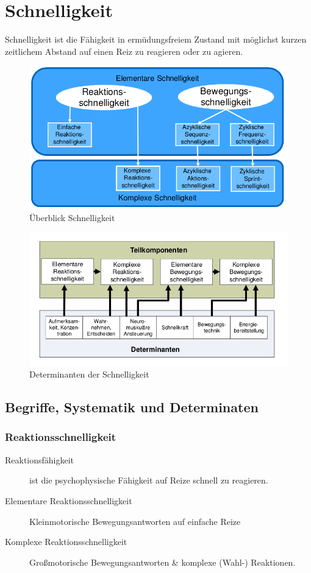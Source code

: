 
\section{Schnelligkeit}
Schnelligkeit ist die Fähigkeit in ermüdungsfreiem Zustand mit möglichst kurzen zeitlichem Abstand auf einen Reiz zu reagieren oder zu agieren.
\begin{figure}[H]
  \centering
  \includegraphics[width=.5\textwidth]{pictures/schnelligkeit_overview.png}
  \caption{Überblick Schnelligkeit}
\end{figure}
\begin{figure}[H]
  \centering
  \includegraphics[width=.5\linewidth]{pictures/schnelligkeit_determinanten.png}
  \caption{Determinanten der Schnelligkeit}
\end{figure}

\subsection{Begriffe, Systematik und Determinaten}
\subsubsection{Reaktionsschnelligkeit}
\begin{description}
  \item[Reaktionsfähigkeit] ist die psychophysische Fähigkeit auf Reize schnell zu reagieren.
  \item[Elementare Reaktionsschnelligkeit] Kleinmotorische Bewegungsantworten auf einfache Reize
  \item[Komplexe Reaktionsschnelligkeit] Großmotorische Bewegungsantworten \& komplexe (Wahl-) Reaktionen.
\end{description}

